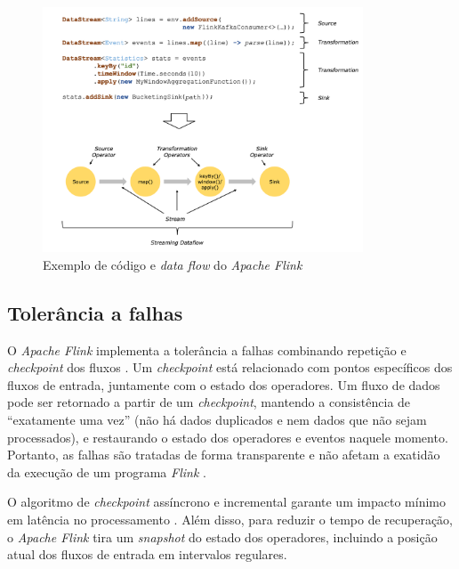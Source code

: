 \begin{figure}[ht]
\centering
\includegraphics[width=0.85\textwidth]{figuras/dataflow-code-flink.png}
\caption{Exemplo de código e \emph{data flow} do \emph{Apache Flink} \cite{ApacheFlink2020}}
\label{fig:dataflow-flink}
\end{figure}

\subsection{Tolerância a falhas}

O \emph{Apache Flink} implementa a tolerância a falhas combinando repetição e
\emph{checkpoint} dos fluxos \cite{Carbone2015,ApacheFlink2020}.
Um \emph{checkpoint} está relacionado com pontos específicos dos fluxos de
entrada, juntamente com o estado dos operadores.
Um fluxo de dados pode ser retornado a partir de um \emph{checkpoint}, mantendo
a consistência de ``exatamente uma vez'' (não há dados duplicados e nem dados que
não sejam processados), e restaurando o estado dos operadores e eventos naquele
momento.
Portanto, as falhas são tratadas de forma transparente e não afetam a exatidão
da execução de um programa \emph{Flink} \cite{ApacheFlink2020}.

O algoritmo de \emph{checkpoint} assíncrono e incremental garante um impacto
mínimo em latência no processamento \cite{Carbone2015}.
Além disso, para reduzir o tempo de recuperação, o \emph{Apache Flink} tira um
\emph{snapshot} do estado dos operadores, incluindo a posição atual dos fluxos
de entrada em intervalos regulares.


